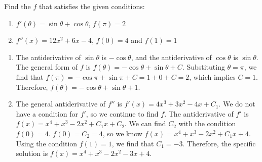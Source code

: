 \begin{Exercise}[label=antideriv4]
	Find the $f$ that satisfies the given conditions:
	\begin{enumerate}
	\item $f'(\theta) = \sin{\theta} + \cos{\theta}$, $f(\pi) = 2$
	\item $f''(x) = 12x^2 + 6x - 4$, $f(0) = 4$ and $f(1) = 1$
	\end{enumerate}
\end{Exercise}
	
\begin{Answer}[ref=antideriv4]
	\begin{enumerate}
	\item The antiderivative of $\sin{\theta}$ is $-\cos{\theta}$, and the 
	antiderivative of $\cos{\theta}$ is $\sin{\theta}$. The general form 
	of $f$ is $f(\theta) = -\cos{\theta} + \sin{\theta} + C$. 
	Substituting $\theta = \pi$, we find that $f(\pi) = -\cos{\pi} + 
	\sin{\pi} + C = 1 + 0 + C = 2$, which implies $C = 1$. Therefore, 
	$f(\theta) = -\cos{\theta} + \sin{\theta} + 1$.
	\item The general antiderivative of $f''$ is $f'(x) = 4x^3 + 3x^2 - 
	4x + C_1$. We do not have a condition for $f'$, so we continue to find 
	$f$. The antiderivative of $f'$ is $f(x) = x^4 + x^3 - 2x^2 + C_1x + 
	C_2$. We can find $C_2$ with the condition $f(0) = 4$. $f(0) = C_2 
	= 4$, so we know $f(x) = x^4 + x^3 - 2x^2 + C_1x + 4$. Using the 
	condition $f(1) = 1$, we find that $C_1 = -3$. Therefore, the specific 
	solution is $f(x) = x^4 + x^3 - 2x^2 - 3x + 4$. 
	\end{enumerate}
	 
\end{Answer}



